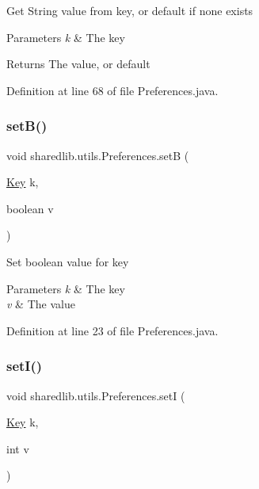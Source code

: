 Get String value from key, or default if none exists 
\begin{DoxyParams}{Parameters}
{\em k} & The key \\
\hline
\end{DoxyParams}
\begin{DoxyReturn}{Returns}
The value, or default 
\end{DoxyReturn}


Definition at line 68 of file Preferences.\+java.

\hypertarget{classsharedlib_1_1utils_1_1_preferences_a6fd1a945420fbcc3702af8a3b961354c}{}\label{classsharedlib_1_1utils_1_1_preferences_a6fd1a945420fbcc3702af8a3b961354c} 
\subsubsection{\texorpdfstring{set\+B()}{setB()}}
{\footnotesize\ttfamily void sharedlib.\+utils.\+Preferences.\+setB (\begin{DoxyParamCaption}\item[{\hyperlink{interfacesharedlib_1_1utils_1_1_preferences_1_1_key}{Key}}]{k,  }\item[{boolean}]{v }\end{DoxyParamCaption})}

Set boolean value for key 
\begin{DoxyParams}{Parameters}
{\em k} & The key \\
\hline
{\em v} & The value \\
\hline
\end{DoxyParams}


Definition at line 23 of file Preferences.\+java.

\hypertarget{classsharedlib_1_1utils_1_1_preferences_a76c07b4fbea8dbe8c2ef21cf31cf57c3}{}\label{classsharedlib_1_1utils_1_1_preferences_a76c07b4fbea8dbe8c2ef21cf31cf57c3} 
\subsubsection{\texorpdfstring{set\+I()}{setI()}}
{\footnotesize\ttfamily void sharedlib.\+utils.\+Preferences.\+setI (\begin{DoxyParamCaption}\item[{\hyperlink{interfacesharedlib_1_1utils_1_1_preferences_1_1_key}{Key}}]{k,  }\item[{int}]{v }\end{DoxyParamCaption})}

